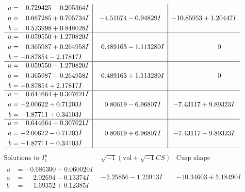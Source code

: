 \documentclass[1p]{elsarticle_modified}
\theoremstyle{definition}
\newcommand{\I}{\sqrt{-1}}
\begin{document}
$$\begin{array}{c|c|c}
\begin{aligned}
u &= -0.729425 - 0.205364 I \\
a &= \phantom{-}0.667285 + 0.705734 I \\
b &= \phantom{-}0.523998 + 0.848028 I\end{aligned}
 & -4.51674 - 0.94829 I & -10.85953 + 1.20447 I \\ \hline\begin{aligned}
u &= \phantom{-}0.059550 + 1.270820 I \\
a &= \phantom{-}0.365987 + 0.264958 I \\
b &= -0.87854 - 2.17817 I\end{aligned}
 & \phantom{-}0.489163 - 1.113280 I & \phantom{-0.000000 } 0 \\ \hline\begin{aligned}
u &= \phantom{-}0.059550 - 1.270820 I \\
a &= \phantom{-}0.365987 - 0.264958 I \\
b &= -0.87854 + 2.17817 I\end{aligned}
 & \phantom{-}0.489163 + 1.113280 I & \phantom{-0.000000 } 0 \\ \hline\begin{aligned}
u &= \phantom{-}0.644664 + 0.307621 I \\
a &= -2.00622 + 0.71203 I \\
b &= -1.87711 + 0.34103 I\end{aligned}
 & \phantom{-}0.80619 - 6.96807 I & -7.43117 + 9.89323 I \\ \hline\begin{aligned}
u &= \phantom{-}0.644664 - 0.307621 I \\
a &= -2.00622 - 0.71203 I \\
b &= -1.87711 - 0.34103 I\end{aligned}
 & \phantom{-}0.80619 + 6.96807 I & -7.43117 - 9.89323 I\\
 \hline 
 \end{array}$$\newpage$$\begin{array}{c|c|c}  
\text{Solutions to }I^u_{1}& \I (\text{vol} + \sqrt{-1}CS) & \text{Cusp shape}\\
 \hline 
\begin{aligned}
u &= -0.686300 + 0.060020 I \\
a &= \phantom{-}2.02694 - 0.13374 I \\
b &= \phantom{-}1.69352 + 0.12385 I\end{aligned}
 & -2.25856 - 1.25913 I & -10.34603 + 5.18490 I \\ \hline\begin{aligned}

\end{aligned}
\end{array}$$
\end{document}
